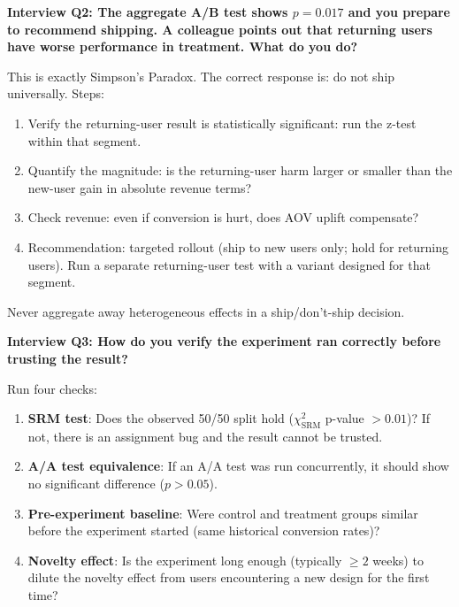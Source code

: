\begin{interviewbox}
  \textbf{Interview Q2: The aggregate A/B test shows $p = 0.017$ and you
  prepare to recommend shipping. A colleague points out that returning users
  have worse performance in treatment. What do you do?}

  This is exactly Simpson's Paradox. The correct response is: do not ship
  universally. Steps:
  \begin{enumerate}
    \item Verify the returning-user result is statistically significant:
      run the z-test within that segment.
    \item Quantify the magnitude: is the returning-user harm larger or smaller
      than the new-user gain in absolute revenue terms?
    \item Check revenue: even if conversion is hurt, does AOV uplift compensate?
    \item Recommendation: targeted rollout (ship to new users only; hold for
      returning users). Run a separate returning-user test with a variant
      designed for that segment.
  \end{enumerate}
  Never aggregate away heterogeneous effects in a ship/don't-ship decision.
\end{interviewbox}

\begin{interviewbox}
  \textbf{Interview Q3: How do you verify the experiment ran correctly before
  trusting the result?}

  Run four checks:
  \begin{enumerate}
    \item \textbf{SRM test}: Does the observed 50/50 split hold
      ($\chi^2_{\mathrm{SRM}}$ p-value $> 0.01$)? If not, there is an
      assignment bug and the result cannot be trusted.
    \item \textbf{A/A test equivalence}: If an A/A test was run concurrently,
      it should show no significant difference ($p > 0.05$).
    \item \textbf{Pre-experiment baseline}: Were control and treatment groups
      similar before the experiment started (same historical conversion rates)?
    \item \textbf{Novelty effect}: Is the experiment long enough (typically
      $\geq 2$ weeks) to dilute the novelty effect from users encountering a
      new design for the first time?
  \end{enumerate}
\end{interviewbox}
